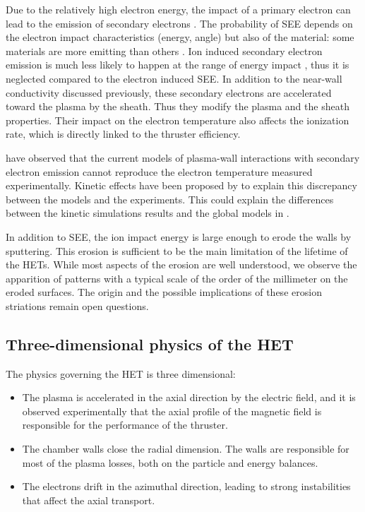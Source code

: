   Due to the relatively high electron energy, the impact of a primary electron can lead to the emission of secondary electrons \citep{barral2003a,villemant2018}.
  The probability of \ac{SEE} depends on the electron impact characteristics (energy, angle) but also of the material\string: some materials are more emitting than others \citep{gascon2003}.
  Ion induced secondary electron emission is much less likely to happen at the range of energy impact \citep{ohya2004}, thus it is neglected compared to the electron induced \ac{SEE}.
  In addition to the near-wall conductivity discussed previously, these secondary electrons are accelerated toward the plasma by the sheath.
  Thus they modify the plasma and the sheath properties.
  Their impact on the electron temperature also affects the ionization rate, which is directly linked to the thruster efficiency.
  
  
  \citet{raitses2005} have observed that the current models of plasma-wall interactions with secondary electron emission cannot reproduce the electron temperature measured experimentally.
  Kinetic effects have been proposed by \citet{sydorenko2007} to explain this discrepancy between the models and the experiments.
  This could explain the differences between the kinetic simulations results and the global models in \citet{croes2017}.   
    
  \vspace{1em}
  In addition to \ac{SEE}, the ion impact energy is large enough to erode the walls by sputtering.
  This erosion is sufficient to be the main limitation of the lifetime of the \ac{HET}s.
  While most aspects of the erosion are well understood, we observe the apparition of  patterns with a typical scale of the order of the millimeter on the eroded surfaces.
  The origin and the possible implications of these erosion striations remain open questions.
  

\subsection{Three-dimensional physics of the HET}
\label{sec-3Dphi}

The physics governing the \ac{HET} is three dimensional\string:
\begin{itemize}
  \item The plasma is accelerated in the axial direction by the electric field, and it is observed experimentally that the axial profile of the magnetic field is responsible for the performance of the thruster.
  \item The chamber walls close the radial dimension. The walls are responsible for most of the plasma losses, both on the particle and energy balances.
  \item The electrons drift in the azimuthal direction, leading to strong instabilities that affect the axial transport.
\end{itemize}

